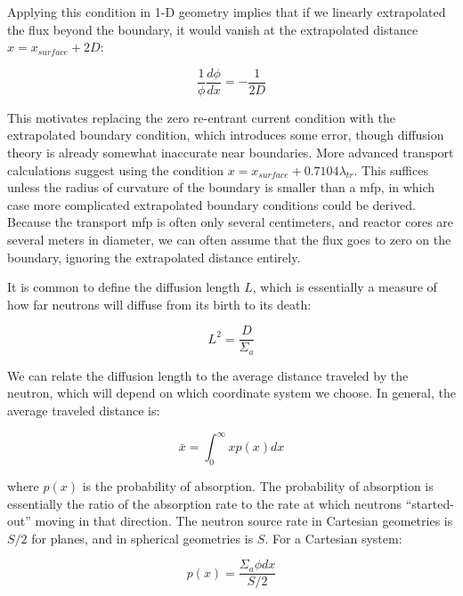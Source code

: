 \documentclass[10pt]{article}
\begin{document}
\begin{flushleft}
Applying this condition in 1-D geometry implies that if we linearly extrapolated the flux beyond the boundary, it would vanish at the extrapolated distance \(x = x_{surface} + 2D\):

\begin{equation}
\label{eq:PartialCurrent_BC2}
\frac{1}{\phi}\frac{d\phi}{dx}=-\frac{1}{2D}
\end{equation}

This motivates replacing the zero re-entrant current condition with the extrapolated boundary condition, which introduces some error, though diffusion theory is already somewhat inaccurate near boundaries. More advanced transport calculations suggest using the condition \(x = x_{surface} + 0.7104\lambda_{tr}\). This suffices unless the radius of curvature of the boundary is smaller than a mfp, in which case more complicated extrapolated boundary conditions could be derived. Because the transport mfp is often only several centimeters, and reactor cores are several meters in diameter, we can often assume that the flux goes to zero on the boundary, ignoring the extrapolated distance entirely.

It is common to define the diffusion length \(L\), which is essentially a measure of how far neutrons will diffuse from its birth to its death:

\begin{equation}
\label{eq:DiffusionLength}
L^2=\frac{D}{\Sigma_a}
\end{equation}

We can relate the diffusion length to the average distance traveled by the neutron, which will depend on which coordinate system we choose. In general, the average traveled distance is:

\begin{equation}
\label{eq:AverageDistance}
\bar{x}=\int_{0}^{\infty}xp(x)dx
\end{equation}

where \(p(x)\) is the probability of absorption. The probability of absorption is essentially the ratio of the absorption rate to the rate at which neutrons ``started-out'' moving in that direction. The neutron source rate in Cartesian geometries is \(S/2\) for planes, and in spherical geometries is \(S\). For a Cartesian system:

\begin{equation}
\label{eq:AbsorptionProbability_Cartesian}
p(x)=\frac{\Sigma_a\phi dx}{S/2}
\end{equation}


\end{flushleft}
\end{document}
